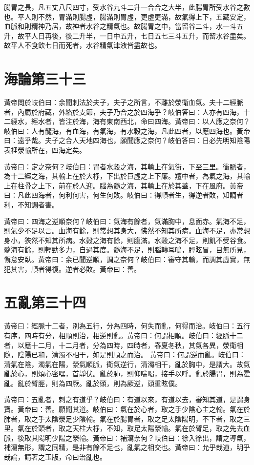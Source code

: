 腸胃之長，凡五丈八尺四寸，受水谷九斗二升一合合之大半，此腸胃所受水谷之數也。平人則不然，胃滿則腸虛，腸滿則胃虛，更虛更滿，故氣得上下，五藏安定，血脈和則精神乃居，故神者水谷之精氣也。故腸胃之中，當留谷二斗，水一斗五升，故平人日再後，後二升半，一日中五升，七日五七三斗五升，而留水谷盡矣。故平人不食飲七日而死者，水谷精氣津液皆盡故也。


\section{海論第三十三}

黃帝問於岐伯曰：余聞刺法於夫子，夫子之所言，不離於滎衛血氣。夫十二經脈者，內屬於府藏，外絡於支節，夫子乃合之於四海乎？岐伯答曰：人亦有四海，十二經水，經水者，皆注於海，海有東南西北，命曰四海。黃帝曰：以人應之奈何？岐伯曰：人有髓海，有血海，有氣海，有水穀之海，凡此四者，以應四海也。黃帝曰：遠乎哉。夫子之合人天地四海也，願聞應之奈何？岐伯答曰：日必先明知陰陽表裡滎輸所在，四海定矣。

黃帝曰：定之奈何？岐伯曰：胃者水穀之海，其輸上在氣街，下至三里。衝脈者，為十二經之海，其輸上在於大杼，下出於巨虛之上下廉。羶中者，為氣之海，其輸上在柱骨之上下，前在於人迎。腦為髓之海，其輸上在於其蓋，下在風府。黃帝曰：凡此四海者，何利何害，何生何敗。岐伯曰：得順者生，得逆者敗，知調者利，不知調者害。

黃帝曰：四海之逆順奈何？岐伯曰：氣海有餘者，氣滿胸中，息面赤。氣海不足，則氣少不足以言。血海有餘，則常想其身大，怫然不知其所病。血海不足，亦常想身小，狹然不知其所病。水穀之海有餘，則腹滿。水穀之海不足，則飢不受谷食。髓海有餘，則輕勁多力，自過其度。髓海不足，則腦轉耳鳴，脛眩冒，目無所見，懈怠安臥。黃帝曰：余已聞逆順，調之奈何？岐伯曰：審守其輸，而調其虛實，無犯其害，順者得復。逆者必敗。黃帝曰：善。



\section{五亂第三十四}

黃帝曰：經脈十二者，別為五行，分為四時，何失而亂，何得而治。岐伯曰：五行有序，四時有分，相順則治，相逆則亂。黃帝曰：何謂相順。岐伯曰：經脈十二者，以應十二月，十二月者，分為四時，四時者，春夏冬秋，其氣各異，滎衛相隨，陰陽已和，清濁不相干，如是則順之而治。
黃帝曰：何謂逆而亂。岐伯曰：清氣在陰，濁氣在陽，滎氣順脈，衛氣逆行，清濁相干，亂於胸中，是謂大。故氣亂於心，則煩心密嘿，首靜伏。亂於肺，則仰喘喝，接手以呼。亂於腸胃，則為霍亂。亂於臂脛，則為四厥。亂於頭，則為厥逆，頭重眩僕。

黃帝曰：五亂者，刺之有道乎？岐伯曰：有道以來，有道以去，審知其道，是謂身寶。黃帝曰：善。願聞其道。岐伯曰：氣在於心者，取之手少陰心主之輸。氣在於肺者，取之手太陰滎足少陰輸。氣在於腸胃者，取之足太陰陽明，不下者，取之三里。氣在於頭者，取之天柱大杼，不知，取足太陽滎輸。氣在於臂足，取之先去血脈，後取其陽明少陽之滎輸。黃帝曰：補瀉奈何？岐伯曰：徐入徐出，謂之導氣，補瀉無形，謂之同精，是非有餘不足也，亂氣之相交也。黃帝曰：允乎哉道，明乎哉論，請著之玉版，命曰治亂也。

